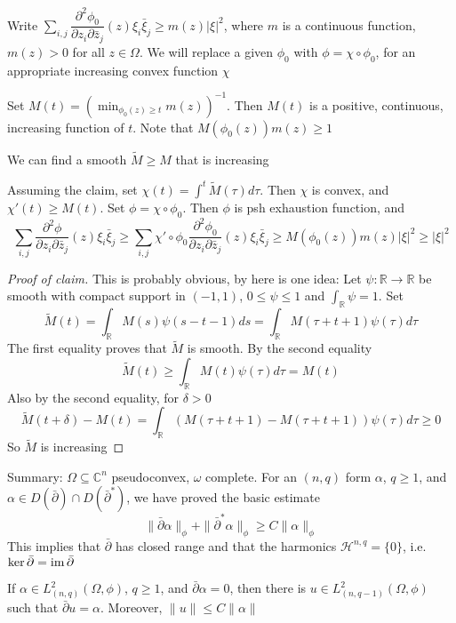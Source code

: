 \documentclass[../main.tex]{subfiles}
\begin{document}
Write $\sum_{i,j}\dfrac{\partial^2\phi_0}{\partial z_i\partial\bar z_j}(z)\xi_i\bar\xi_j\geq m(z)|\xi|^2$, where $m$ is a continuous function, $m(z)>0$ for all $z\in\Omega$. We will replace a given $\phi_0$ with $\phi=\chi\circ\phi_0$, for an appropriate increasing convex function $\chi$

Set $M(t)=(\min_{\phi_0(z)\geq t}m(z))^{-1}$. Then $M(t)$ is a positive, continuous, increasing function of $t$. Note that $M(\phi_0(z))m(z)\geq1$

\begin{claim}
We can find a smooth $\tilde M\geq M$ that is increasing
\end{claim}

Assuming the claim, set $\chi(t)=\int^t\tilde M(\tau)d\tau$. Then $\chi$ is convex, and $\chi'(t)\geq M(t)$. Set $\phi=\chi\circ\phi_0$. Then $\phi$ is psh exhaustion function, and
\[\sum_{i,j}\frac{\partial^2\phi}{\partial z_i\partial\bar z_j}(z)\xi_i\bar\xi_j\geq\sum_{i,j}\chi'\circ\phi_0\frac{\partial^2\phi_0}{\partial z_i\partial\bar z_j}(z)\xi_i\bar\xi_j\geq M(\phi_0(z))m(z)|\xi|^2\geq|\xi|^2\]

\begin{proof}[Proof of claim]
This is probably obvious, by here is one idea: Let $\psi:\mathbb R\to\mathbb R$ be smooth with compact support in $(-1,1)$, $0\leq\psi\leq 1$ and $\int_{\mathbb R}\psi=1$. Set
\[\tilde M(t)=\int_{\mathbb R}M(s)\psi(s-t-1)ds=\int_{\mathbb R}M(\tau+t+1)\psi(\tau)d\tau\]
The first equality proves that $\tilde M$ is smooth. By the second equality
\[\tilde M(t)\geq\int_{\mathbb R}M(t)\psi(\tau)d\tau=M(t)\]
Also by the second equality, for $\delta>0$
\[\tilde M(t+\delta)-M(t)=\int_{\mathbb R}(M(\tau+t+1)-M(\tau+t+1))\psi(\tau)d\tau\geq0\]
So $\tilde M$ is increasing
\end{proof}

Summary: $\Omega\subseteq\mathbb C^n$ pseudoconvex, $\omega$ complete. For an $(n,q)$ form $\alpha$, $q\geq1$, and $\alpha\in D(\bar\partial)\cap D(\bar\partial^*)$, we have proved the basic estimate
\[\|\bar\partial\alpha\|_\phi+\|\bar\partial^*\alpha\|_\phi\geq C\|\alpha\|_\phi\]
This implies that $\bar\partial$ has closed range and that the harmonics $\mathcal H^{n,q}=\{0\}$, i.e. $\ker\bar\partial=\operatorname{im}\bar\partial$

\begin{theorem}
If $\alpha\in L^2_{(n,q)}(\Omega,\phi)$, $q\geq1$, and $\bar\partial\alpha=0$, then there is $u\in L^2_{(n,q-1)}(\Omega,\phi)$ such that $\bar\partial u=\alpha$. Moreover, $\|u\|\leq C\|\alpha\|$
\end{theorem}
\end{document}
